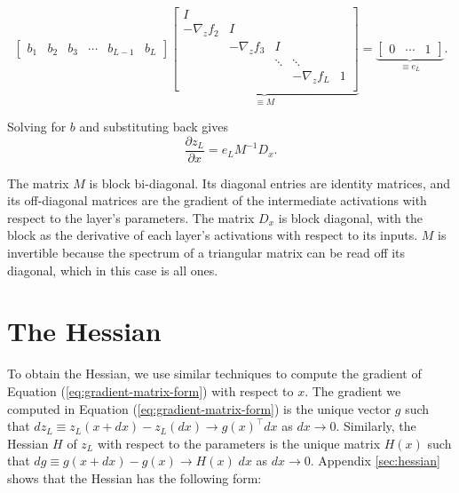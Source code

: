 \documentclass{article}
\begin{document}
\begin{equation}
  \begin{bmatrix}
    b_1 & b_2 & b_3 & \cdots & b_{L-1} & b_L
  \end{bmatrix}
  \underbrace{
    \begin{bmatrix}
      I                                                          \\
      -\nabla_z f_2 & I                                          \\
                    & -\nabla_z f_3 & I                          \\
                    &               & \ddots & \ddots            \\
                    &               &        & -\nabla_z f_L & 1 \\
    \end{bmatrix}
  }_{\equiv M}
  =
  \underbrace{
    \begin{bmatrix}
      0 & \cdots & 1
    \end{bmatrix}
  }_{\equiv e_L}.
\end{equation}

Solving for $b$ and substituting back gives
\begin{equation}\label{eq:gradient-matrix-form}
  \frac{\partial z_L}{\partial x} =  e_L M^{-1} D_x.
\end{equation}

The matrix $M$ is block bi-diagonal. Its diagonal entries are identity matrices, and its off-diagonal matrices are the
gradient of the intermediate activations with respect to the layer's parameters. The matrix $D_x$ is block diagonal,
with the block as the derivative of each layer's activations with respect to its inputs. $M$ is invertible because the
spectrum of a triangular matrix can be read off its diagonal, which in this case is all ones.

\section{The Hessian}

To obtain the Hessian, we use similar techniques to compute the gradient of
Equation (\ref{eq:gradient-matrix-form}) with respect to $x$.  The gradient we
computed in Equation (\ref{eq:gradient-matrix-form}) is the unique vector $g$
such that $d z_L \equiv z_L(x+dx) - z_L(dx) \to g(x)^\top dx$ as $dx\to 0$.
Similarly, the Hessian $H$ of $z_L$ with respect to the parameters is the unique
matrix $H(x)$ such that $dg\equiv g(x+dx)- g(x)\to H(x)\; dx$
as $dx \to 0$. Appendix \ref{sec:hessian} shows that the Hessian has the following form:
\end{document}
